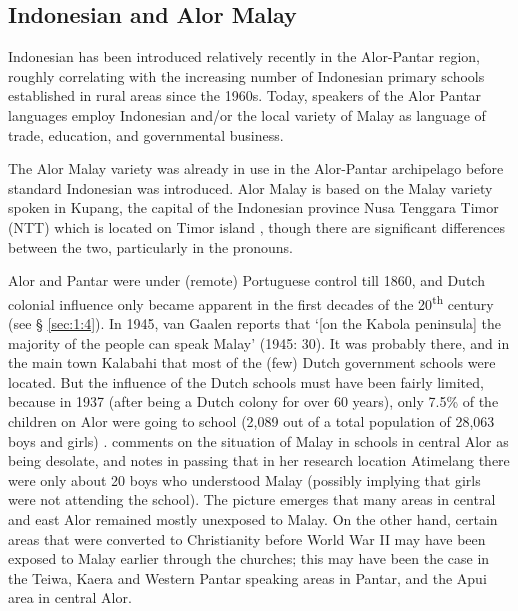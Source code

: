 \subsection{Indonesian and Alor Malay}\label{sec:1:2.3}
Indonesian has been introduced relatively recently in the Alor-Pantar region, roughly correlating with the increasing number of Indonesian primary schools established in rural areas since the 1960s. Today, speakers of the Alor Pantar languages employ Indonesian and/or the local variety of Malay as language of trade, education, and governmental business. 

The Alor Malay variety was already in use in the Alor-Pantar archipelago before standard Indonesian was introduced. Alor Malay is based on the Malay variety spoken in Kupang, the capital of the Indonesian province Nusa Tenggara Timor (NTT) which is located on Timor island \citep{JacobEtAl2003,BairdEtAlMs}, though there are significant differences between the two, particularly in the pronouns. 

Alor and Pantar were under (remote) Portuguese control till 1860, and Dutch colonial influence only became apparent in the first decades of the 20\textsuperscript{th} century (see {\S} \ref{sec:1:4}). In 1945, van Gaalen reports that `[on the Kabola peninsula] the majority of the people can speak Malay' (1945: 30). It was probably there, and in the main town Kalabahi that most of the (few) Dutch government schools were located. But the influence of the Dutch schools must have been fairly limited, because in 1937 (after being a Dutch colony for over 60 years), only 7.5\% of the children on Alor were going to school (2,089 out of a total population of 28,063 boys and girls) \citep[24,41a]{VanGaalen1945}. \citet[17]{DuBois1960} comments on the situation of Malay in schools in central Alor as being desolate, and notes in passing that in her research location Atimelang there were only about 20 boys who understood Malay (possibly implying that girls were not attending the school). The picture emerges that many areas in central and east Alor remained mostly unexposed to Malay. On the other hand, certain areas that were converted to Christianity before World War II may have been exposed to Malay earlier through the churches; this may have been the case in the Teiwa, Kaera and Western Pantar speaking areas in Pantar, and the Apui area in central Alor. 

